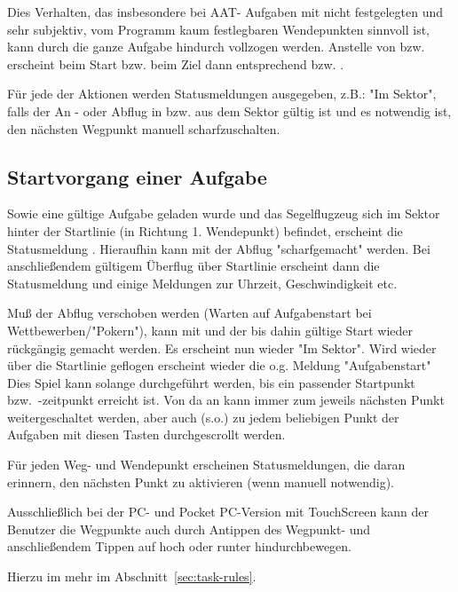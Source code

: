 Dies Verhalten, das insbesondere bei AAT- Aufgaben mit nicht festgelegten und sehr subjektiv, vom Programm kaum festlegbaren Wendepunkten sinnvoll ist, kann durch die ganze Aufgabe hindurch vollzogen werden. Anstelle von  bzw.  erscheint beim Start bzw. beim Ziel dann entsprechend  bzw. .

Für jede der Aktionen  werden Statusmeldungen ausgegeben, z.B.: "Im Sektor", falls der An - oder Abflug in bzw. aus dem Sektor gültig ist und es notwendig ist, den nächsten Wegpunkt manuell scharfzuschalten.

\subsection*{Startvorgang einer Aufgabe}

Sowie eine gültige Aufgabe geladen wurde und das Segelflugzeug sich im Sektor hinter der Startlinie (in Richtung 1. Wendepunkt) befindet, erscheint die Statusmeldung .
 Hieraufhin kann mit  der Abflug "scharfgemacht" werden. Bei anschließendem gültigem Überflug über Startlinie erscheint dann die Statusmeldung     und einige Meldungen zur Uhrzeit, Geschwindigkeit etc.

Muß der Abflug verschoben werden (Warten auf Aufgabenstart bei Wettbewerben/"Pokern"), kann mit  und  der bis dahin gültige Start wieder rückgängig gemacht werden. Es erscheint nun wieder "Im Sektor".
Wird wieder über die Startlinie geflogen erscheint wieder die o.g. Meldung "Aufgabenstart"  Dies Spiel kann solange durchgeführt werden, bis ein passender Startpunkt bzw.\ -zeitpunkt  erreicht ist. Von da an kann immer zum jeweils nächsten Punkt weitergeschaltet werden, aber auch (s.o.) zu jedem beliebigen Punkt der Aufgaben  mit diesen Tasten durchgescrollt werden.

Für jeden Weg- und Wendepunkt erscheinen Statusmeldungen, die daran erinnern, den nächsten Punkt zu aktivieren (wenn manuell notwendig).

Ausschließlich bei der  PC- und Pocket PC-Version mit TouchScreen kann der Benutzer die Wegpunkte auch durch Antippen des Wegpunkt-{\InfoBox} und anschließendem Tippen auf hoch oder runter hindurchbewegen.

Hierzu im mehr im Abschnitt~\ref{sec:task-rules}.

